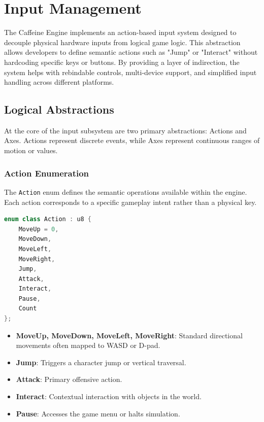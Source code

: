 \chapter{Input Management}

The Caffeine Engine implements an action-based input system designed to decouple physical hardware inputs from logical game logic. This abstraction allows developers to define semantic actions such as "Jump" or "Interact" without hardcoding specific keys or buttons. By providing a layer of indirection, the system helps with rebindable controls, multi-device support, and simplified input handling across different platforms.

\section{Logical Abstractions}

At the core of the input subsystem are two primary abstractions: Actions and Axes. Actions represent discrete events, while Axes represent continuous ranges of motion or values.

\subsection{Action Enumeration}

The \texttt{Action} enum defines the semantic operations available within the engine. Each action corresponds to a specific gameplay intent rather than a physical key.

\begin{lstlisting}[language=C++]
enum class Action : u8 {
    MoveUp = 0,
    MoveDown,
    MoveLeft,
    MoveRight,
    Jump,
    Attack,
    Interact,
    Pause,
    Count
};
\end{lstlisting}

\begin{itemize}
    \item \textbf{MoveUp, MoveDown, MoveLeft, MoveRight}: Standard directional movements often mapped to WASD or D-pad.
    \item \textbf{Jump}: Triggers a character jump or vertical traversal.
    \item \textbf{Attack}: Primary offensive action.
    \item \textbf{Interact}: Contextual interaction with objects in the world.
    \item \textbf{Pause}: Accesses the game menu or halts simulation.
\end{itemize}

